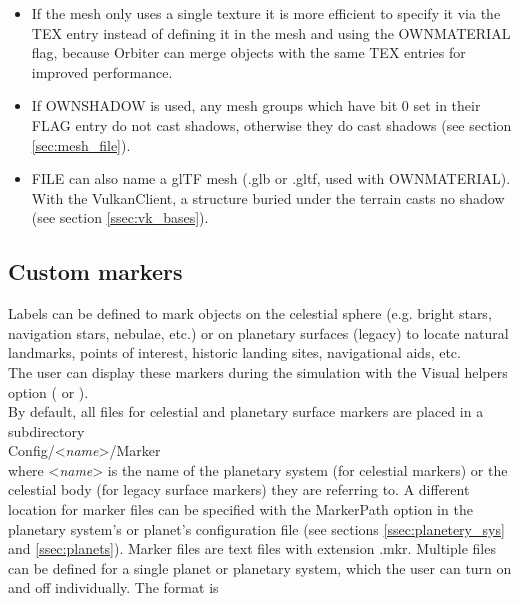 \documentclass[Orbiter Developer Manual.tex]{subfiles}
\begin{document}
\begin{itemize}
\item If the mesh only uses a single texture it is more efficient to specify it via the TEX entry instead of defining it in the mesh and using the OWNMATERIAL flag, because Orbiter can merge objects with the same TEX entries for improved performance.
\item If OWNSHADOW is used, any mesh groups which have bit 0 set in their FLAG entry do not cast shadows, otherwise they do cast shadows (see section \ref{sec:mesh_file}).
\item FILE can also name a glTF mesh (.glb or .gltf, used with OWNMATERIAL). With the VulkanClient, a structure buried under the terrain casts no shadow (see section \ref{ssec:vk_bases}).
\end{itemize}


\subsection{Custom markers}
\label{ssec:custom_markers}

\noindent
Labels can be defined to mark objects on the celestial sphere (e.g. bright stars, navigation stars, nebulae, etc.) or on planetary surfaces (legacy) to locate natural landmarks, points of interest, historic landing sites, navigational aids, etc.\\
The user can display these markers during the simulation with the Visual helpers option ( or \Alt{}).\\
By default, all files for celestial and planetary surface markers are placed in a subdirectory\\
\indent Config/<\textit{name}>/Marker\\
where <\textit{name}> is the name of the planetary system (for celestial markers) or the celestial body (for legacy surface markers) they are referring to. A different location for marker files can be specified with the MarkerPath option in the planetary system's or planet's configuration file (see sections \ref{ssec:planetery_sys} and \ref{ssec:planets}). Marker files are text files with extension .mkr. Multiple files can be defined for a single planet or planetary system, which the user can turn on and off individually. The format is
\end{document}
